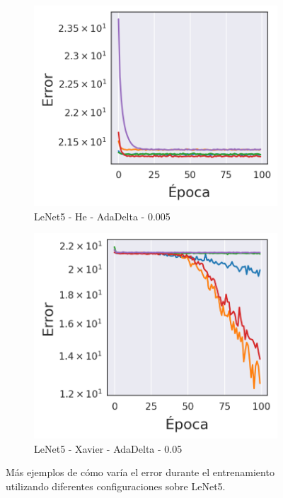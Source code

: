 \begin{figure}[H]
    \bigskip

    \begin{subfigure}{.47\textwidth}
        \centering
        \includegraphics[width=1\linewidth]{imagenes/image_classification/original_dataset/loss4.png}
        \caption{LeNet5 - He - AdaDelta - 0.005}
    \end{subfigure}%
    \begin{subfigure}{.47\textwidth}
        \centering
        \includegraphics[width=1\linewidth]{imagenes/image_classification/original_dataset/loss5.png}
        \caption{LeNet5 - Xavier - AdaDelta - 0.05}
    \end{subfigure}

    \caption{Más ejemplos de cómo varía el error durante el entrenamiento utilizando diferentes configuraciones sobre LeNet5.}
\end{figure}

